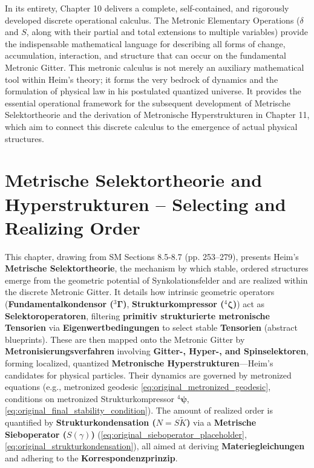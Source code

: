 \documentclass[12pt]{article}
\newcommand{\fundamentalkondensor}{{}^3\bm{\Gamma}}
\newcommand{\metrondifferential}{\delta}
\newcommand{\metronintegral}{S}
\newcommand{\metrischesieboperator}{S(\gamma)}
\newcommand{\strukturkompressor}{{}^4\bm{\zeta}}
\newcommand{\metronischerstrukturkompressor}{{}^4\bm{\psi}}
\begin{document}
In its entirety, Chapter 10 delivers a complete, self-contained, and rigorously developed discrete operational calculus. The Metronic Elementary Operations (\( \metrondifferential \) and \( \metronintegral \), along with their partial and total extensions to multiple variables) provide the indispensable mathematical language for describing all forms of change, accumulation, interaction, and structure that can occur on the fundamental Metronic Gitter. This metronic calculus is not merely an auxiliary mathematical tool within Heim's theory; it forms the very bedrock of dynamics and the formulation of physical law in his postulated quantized universe. It provides the essential operational framework for the subsequent development of Metrische Selektortheorie and the derivation of Metronische Hyperstrukturen in Chapter 11, which aim to connect this discrete calculus to the emergence of actual physical structures.

\clearpage 
\section{Metrische Selektortheorie and Hyperstrukturen – Selecting and Realizing Order}
\label{sec:chapter11}

This chapter, drawing from SM Sections 8.5-8.7 (pp. 253–279), presents Heim's \textbf{Metrische Selektortheorie}, the mechanism by which stable, ordered structures emerge from the geometric potential of Synkolationsfelder and are realized within the discrete Metronic Gitter. It details how intrinsic geometric operators (\textbf{Fundamentalkondensor (\(\fundamentalkondensor\))}, \textbf{Strukturkompressor (\(\strukturkompressor\))}) act as \textbf{Selektoroperatoren}, filtering \textbf{primitiv strukturierte metronische Tensorien} via \textbf{Eigenwertbedingungen} to select stable \textbf{Tensorien} (abstract blueprints). These are then mapped onto the Metronic Gitter by \textbf{Metronisierungsverfahren} involving \textbf{Gitter-, Hyper-, and Spinselektoren}, forming localized, quantized \textbf{Metronische Hyperstrukturen}—Heim's candidates for physical particles. Their dynamics are governed by metronized equations (e.g., metronized geodesic \eqref{eq:original_metronized_geodesic}, conditions on metronized Strukturkompressor \(\metronischerstrukturkompressor\), \eqref{eq:original_final_stability_condition}). The amount of realized order is quantified by \textbf{Strukturkondensation (\(N = S\tilde{K}\))} via a \textbf{Metrische Sieboperator (\(\metrischesieboperator\))} (\eqref{eq:original_sieboperator_placeholder}, \eqref{eq:original_strukturkondensation}), all aimed at deriving \textbf{Materiegleichungen} and adhering to the \textbf{Korrespondenzprinzip}.
\end{document}
